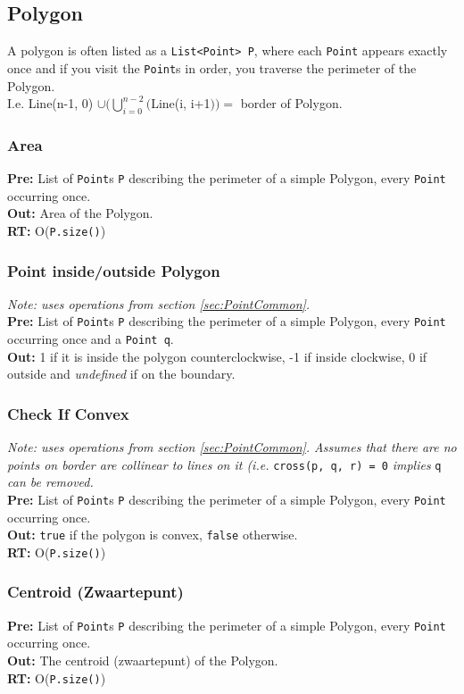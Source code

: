 \documentclass[a4paper,10pt]{article}
\begin{document}
\begin{multicols}{2}
\subsection{Polygon}
A polygon is often listed as a \lstinline|List<Point> P|, where each \lstinline|Point| appears exactly once and if you visit the \lstinline|Point|s in order, you traverse the perimeter of the Polygon. \\I.e. Line(n-1, 0) $\cup(\bigcup\limits_{i=0}^{n-2}($Line(i, i+1$))=$ border of Polygon.  
\subsubsection{Area}
\textbf{Pre:} List of \lstinline|Point|s \lstinline|P| describing the perimeter of a simple Polygon, every \lstinline|Point| occurring once.\\
\textbf{Out:} Area of the Polygon.\\
\textbf{RT:} O(\lstinline|P.size()|)

\subsubsection{Point inside/outside Polygon}
\textit{Note: uses operations from section \ref{sec:PointCommon}.}\\
\textbf{Pre:} List of \lstinline|Point|s \lstinline|P| describing the perimeter of a simple Polygon, every \lstinline|Point| occurring once and a \lstinline|Point q|.\\
\textbf{Out:} 1 if it is inside the polygon counterclockwise, -1 if inside clockwise, 0 if outside and \textit{undefined} if on the boundary.

\subsubsection{Check If Convex}
\textit{Note: uses operations from section \ref{sec:PointCommon}. Assumes that there are no points on border are collinear to lines on it (i.e. }\lstinline|cross(p, q, r) = 0|\textit{ implies }\lstinline|q|\textit{ can be removed.}\\
\textbf{Pre:} List of \lstinline|Point|s \lstinline|P| describing the perimeter of a simple Polygon, every \lstinline|Point| occurring once.\\
\textbf{Out:} \lstinline|true| if the polygon is convex, \lstinline|false| otherwise.\\
\textbf{RT:} O(\lstinline|P.size()|)

\subsubsection{Centroid (Zwaartepunt)}
\textbf{Pre:} List of \lstinline|Point|s \lstinline|P| describing the perimeter of a simple Polygon, every \lstinline|Point| occurring once.\\
\textbf{Out:} The centroid (zwaartepunt) of the Polygon.\\
\textbf{RT:} O(\lstinline|P.size()|)


\end{multicols}
\end{document}
